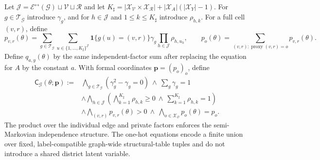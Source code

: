 Let \(\mathcal J=\mathcal E^{\leftrightarrow}(\mathcal G)\sqcup\mathcal V\sqcup\mathcal R\) and let \(K_{\sharp}=|\mathcal X_{\mathcal V}\times\mathcal X_{\mathcal R}|+|\mathcal X_A|(|\mathcal X_Y|-1)\). For \(g\in\mathcal T_{\mathcal G}\) introduce \(\gamma_g\), and for \(h\in\mathcal J\) and \(1\leq k\leq K_{\sharp}\) introduce \(\rho_{h,k}\). For a full cell \((v,r)\), define
\[
p_{v,r}(\theta)=\sum_{g\in\mathcal T_{\mathcal G}}\sum_{u\in\{1,\ldots,K_{\sharp}\}^{\mathcal J}}\mathbf 1\{g(u)=(v,r)\}\gamma_g\prod_{h\in\mathcal J}\rho_{h,u_h},
\qquad
p_o(\theta)=\sum_{(v,r):\operatorname{proxy}(v,r)=o}p_{v,r}(\theta).
\]
Define \(q_{a,y}(\theta)\) by the same independent-factor sum after replacing the equation for \(A\) by the constant \(a\). With formal coordinates \(\mathbf p=(p_o)_o\), define
\[
\begin{aligned}
\mathsf C_{\mathcal G}(\theta;\mathbf p):={}&
\bigwedge_{g\in\mathcal T_{\mathcal G}}(\gamma_g^2-\gamma_g=0)
\ \wedge\ \sum_g\gamma_g=1\\
&\wedge\bigwedge_{h\in\mathcal J}
\left(\bigwedge_{k=1}^{K_{\sharp}}\rho_{h,k}\geq0
\ \wedge\ \sum_{k=1}^{K_{\sharp}}\rho_{h,k}=1\right)\\
&\wedge\bigwedge_{(v,r)}p_{v,r}(\theta)>0
\ \wedge\ \bigwedge_{o\in\mathcal X_{\mathcal O}}p_o(\theta)=p_o.
\end{aligned}
\]
The product over the individual edge and private factors enforces the semi-Markovian independence structure. The one-hot equations encode a finite union over fixed, label-compatible graph-wide structural-table tuples and do not introduce a shared district latent variable.